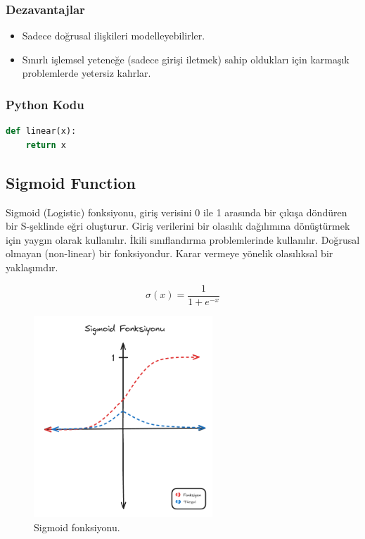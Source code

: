 \subsubsection{Dezavantajlar}
\begin{itemize}
    \item Sadece doğrusal ilişkileri modelleyebilirler.
    \item Sınırlı işlemsel yeteneğe (sadece girişi iletmek) sahip oldukları için karmaşık problemlerde yetersiz kalırlar.
\end{itemize}

\subsubsection{Python Kodu}

\begin{lstlisting}[language=Python]
def linear(x):
    return x
\end{lstlisting}

\newpage

\subsection{Sigmoid Function}
Sigmoid (Logistic) fonksiyonu, giriş verisini 0 ile 1 arasında bir çıkışa döndüren bir S-şeklinde eğri oluşturur. Giriş verilerini bir olasılık dağılımına dönüştürmek için yaygın olarak kullanılır. İkili sınıflandırma problemlerinde kullanılır. Doğrusal olmayan (non-linear) bir fonksiyondur. Karar vermeye yönelik olasılıksal bir yaklaşımdır.

\[\sigma(x) = \frac{1}{1 + e^{-x}}\]

\begin{figure}[h]
    \centering
    \includegraphics[width=0.6\textwidth]{images/sigmoid_function.png}
    \caption{Sigmoid fonksiyonu.}
    \label{fig:enter-label}
\end{figure}

